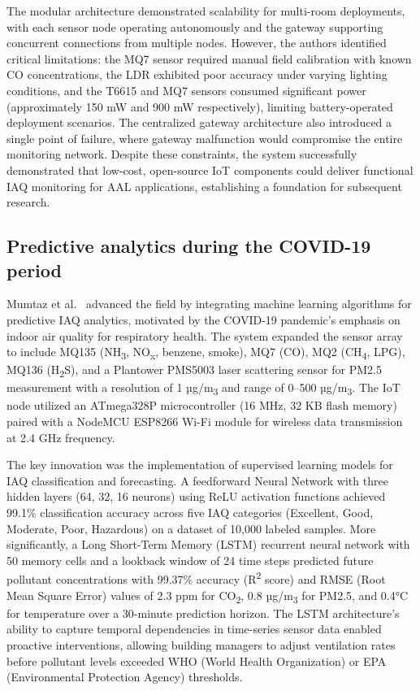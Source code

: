 \documentclass[12pt]{report}
\begin{document}
The modular architecture demonstrated scalability for multi-room deployments, with each sensor node operating autonomously and the gateway supporting concurrent connections from multiple nodes. However, the authors identified critical limitations: the MQ7 sensor required manual field calibration with known CO concentrations, the LDR exhibited poor accuracy under varying lighting conditions, and the T6615 and MQ7 sensors consumed significant power (approximately 150 mW and 900 mW respectively), limiting battery-operated deployment scenarios. The centralized gateway architecture also introduced a single point of failure, where gateway malfunction would compromise the entire monitoring network. Despite these constraints, the system successfully demonstrated that low-cost, open-source IoT components could deliver functional IAQ monitoring for AAL applications, establishing a foundation for subsequent research.

\subsection{Predictive analytics during the COVID-19 period}
Mumtaz et al.~\cite{mumtaz2021} advanced the field by integrating machine learning algorithms for predictive IAQ analytics, motivated by the COVID-19 pandemic's emphasis on indoor air quality for respiratory health. The system expanded the sensor array to include MQ135 (NH\textsubscript{3}, NO\textsubscript{x}, benzene, smoke), MQ7 (CO), MQ2 (CH\textsubscript{4}, LPG), MQ136 (H\textsubscript{2}S), and a Plantower PMS5003 laser scattering sensor for PM2.5 measurement with a resolution of 1 µg/m\textsubscript{3} and range of 0--500 µg/m\textsubscript{3}. The IoT node utilized an ATmega328P microcontroller (16 MHz, 32 KB flash memory) paired with a NodeMCU ESP8266 Wi-Fi module for wireless data transmission at 2.4 GHz frequency.

The key innovation was the implementation of supervised learning models for IAQ classification and forecasting. A feedforward Neural Network with three hidden layers (64, 32, 16 neurons) using ReLU activation functions achieved 99.1\% classification accuracy across five IAQ categories (Excellent, Good, Moderate, Poor, Hazardous) on a dataset of 10,000 labeled samples. More significantly, a Long Short-Term Memory (LSTM) recurrent neural network with 50 memory cells and a lookback window of 24 time steps predicted future pollutant concentrations with 99.37\% accuracy (R\textsuperscript{2} score) and RMSE (Root Mean Square Error) values of 2.3 ppm for CO\textsubscript{2}, 0.8 µg/m\textsubscript{3} for PM2.5, and 0.4°C for temperature over a 30-minute prediction horizon. The LSTM architecture's ability to capture temporal dependencies in time-series sensor data enabled proactive interventions, allowing building managers to adjust ventilation rates before pollutant levels exceeded WHO (World Health Organization) or EPA (Environmental Protection Agency) thresholds.
\end{document}
